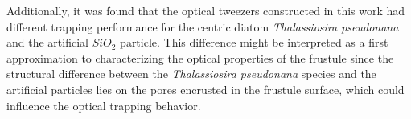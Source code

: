 \documentclass[letterpaper,12pt,oneside]{book}
\begin{document}
Additionally, it was found that the optical tweezers constructed in this work had different trapping performance for the centric diatom \textit{Thalassiosira pseudonana} and the artificial $SiO_2$ particle.
This difference might be interpreted as a first approximation to characterizing the optical properties of the frustule since the structural difference between the \textit{Thalassiosira pseudonana} species and the artificial particles lies on the pores encrusted in the frustule surface, which could influence the optical trapping behavior. %








\end{document}
